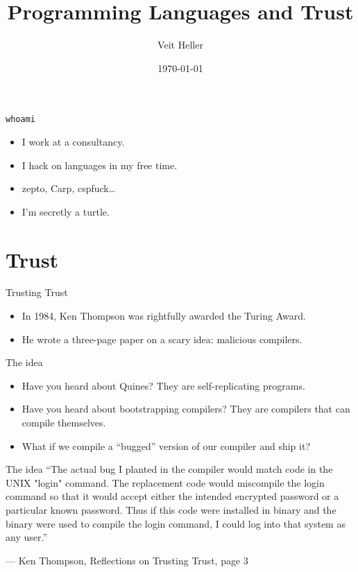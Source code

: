 \documentclass[aspectratio=169]{beamer}
\title{Programming Languages and Trust}
\date{\today}
\author{Veit Heller}
\institute{Datengarten | CCCB}
\begin{document}
  \maketitle
  \begin{frame}{\texttt{whoami}}
    \begin{itemize}
      \item I work at a consultancy.
      \item I hack on languages in my free time.
      \item zepto, Carp, cspfuck\ldots
      \item I’m secretly a turtle.
    \end{itemize}
  \end{frame}
  \section{Trust}
  \begin{frame}{Trusting Trust}
    \begin{itemize}
      \item In 1984, Ken Thompson was rightfully awarded the Turing Award.
      \item He wrote a three-page paper on a scary idea: malicious compilers.
    \end{itemize}
  \end{frame}
  \begin{frame}{The idea}
    \begin{itemize}
      \item Have you heard about Quines? They are self-replicating programs.
      \item Have you heard about bootstrapping compilers? They are compilers
            that can compile themselves.
      \item What if we compile a “bugged” version of our compiler and ship it?
    \end{itemize}
  \end{frame}
  \begin{frame}{The idea}
    “The actual bug I planted in the compiler would match code in the UNIX
     "login" command.  The replacement code would miscompile the login
     command so that it would accept either the intended encrypted password
     or a particular known password. Thus if this code were installed in
     binary and the binary were used to compile the login command, I could
     log into that system as any user.”

     \indent — Ken Thompson, Reflections on Trusting Trust, page 3
  \end{frame}
\end{document}
